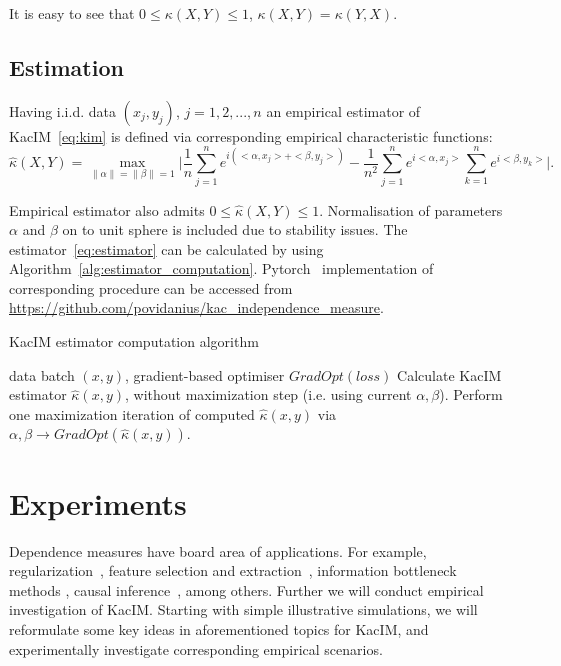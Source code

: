 \documentclass{article}
\begin{document}
\noindent It is easy to see that $0 \leq \kappa(X,Y) \leq 1$, $\kappa(X,Y) = \kappa(Y,X)$. 

\subsection{Estimation}

Having i.i.d. data $(x_{j}, y_{j})$, $j = 1,2,...,n$ an empirical estimator of KacIM~\eqref{eq:kim} is defined via corresponding empirical characteristic functions:
\begin{equation}
\label{eq:estimator}
    \hat{\kappa}(X,Y) = \max_{\|\alpha\| = \|\beta\| = 1} \vert \frac{1}{n} \sum_{j=1}^{n} e^{i(<\alpha, x_{j}> + <\beta, y_{j}>) } - \frac{1}{n^2} \sum_{j=1}^{n} e^{i <\alpha, x_{j}>}\sum_{k=1}^{n} e^{i<\beta, y_{k}>}\vert.
\end{equation}

\noindent Empirical estimator also admits $0 \leq \hat{\kappa}(X,Y) \leq 1$. Normalisation of parameters $\alpha$ and $\beta$ on to unit sphere is included due to stability issues. The  estimator~\eqref{eq:estimator} can be calculated by using Algorithm~\ref{alg:estimator_computation}. Pytorch~\cite{Pytorch} implementation of corresponding procedure can be accessed from \url{https://github.com/povidanius/kac_independence_measure}.

\begin{algorithm}
\caption{KacIM estimator computation algorithm}\label{alg:estimator_computation}
\begin{algorithmic}
\Require data batch $(x,y)$, gradient-based optimiser $GradOpt(loss)$
\State Calculate KacIM estimator $\hat{\kappa}(x,y)$, without maximization step (i.e. using current $\alpha, \beta$).
\State Perform one maximization iteration of computed $\hat{\kappa}(x,y)$ via $\alpha, \beta \rightarrow GradOpt(\hat{\kappa}(x,y))$.
\end{algorithmic}
\end{algorithm}

\section{Experiments}
\label{section:experiments}
Dependence measures have board area of applications. For example, regularization~\cite{?,?}, feature selection and extraction~\cite{?}, information bottleneck methods \cite{?}, causal inference~\cite{?}, among others. Further we will conduct empirical investigation of KacIM. Starting with simple illustrative simulations, we will reformulate some key ideas in aforementioned topics for KacIM, and experimentally investigate corresponding empirical scenarios.
\end{document}
